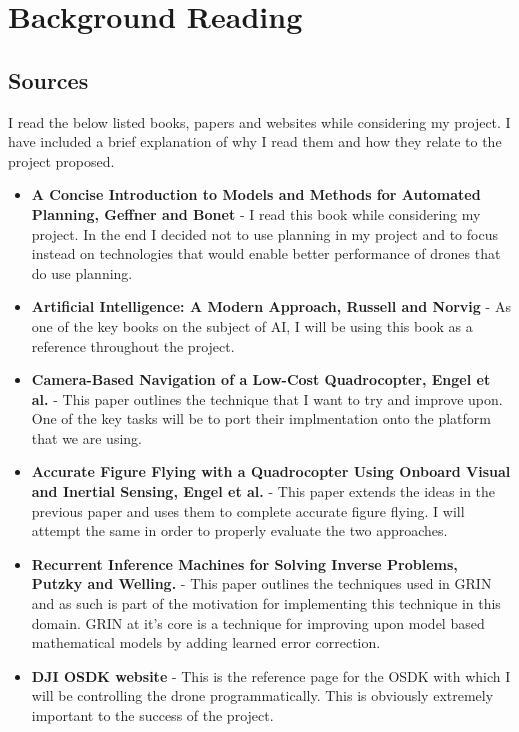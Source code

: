 \documentclass[]{final_report}
\begin{document}

\chapter{Background Reading}
\section{Sources}
I read the below listed books, papers and websites while considering my project. I have included a brief explanation of why I read them and how they relate to the project proposed.

\begin{itemize}
  \item \textbf{A Concise Introduction to Models and Methods for Automated Planning, Geffner and Bonet} \cite{Geffner:2013:CIM:2534474} -  I read this book while considering my project. In the end I decided not to use planning in my project and to focus instead on technologies that would enable better performance of drones that do use planning.
  \item \textbf{Artificial Intelligence: A Modern Approach, Russell and Norvig} \cite{Russell:2009:AIM:1671238} - As one of the key books on the subject of AI, I will be using this book as a reference throughout the project.
  \item \textbf{Camera-Based Navigation of a Low-Cost Quadrocopter, Engel et al.} \cite{CameraBasedNav}  - This paper outlines the technique that I want to try and improve upon. One of the key tasks will be to port their implmentation onto the platform that we are using.
  \item \textbf{Accurate Figure Flying with a Quadrocopter Using Onboard Visual and Inertial Sensing, Engel et al.} \cite{FigureFlying} - This paper extends the ideas in the previous paper and uses them to complete accurate figure flying. I will attempt the same in order to properly evaluate the two approaches.
  \item \textbf{Recurrent Inference Machines for Solving Inverse Problems, Putzky and Welling.} \cite{DBLP:journals/corr/PutzkyW17}  - This paper outlines the techniques used in GRIN and as such is part of the motivation for implementing this technique in this domain. GRIN at it's core is a technique for improving upon model based mathematical models by adding learned error correction.
  \item \textbf{DJI OSDK website} \cite{dji:OSDK}- This is the reference page for the OSDK with which I will be controlling the drone programmatically. This is obviously extremely important to the success of the project.

\end{itemize}
\end{document}

